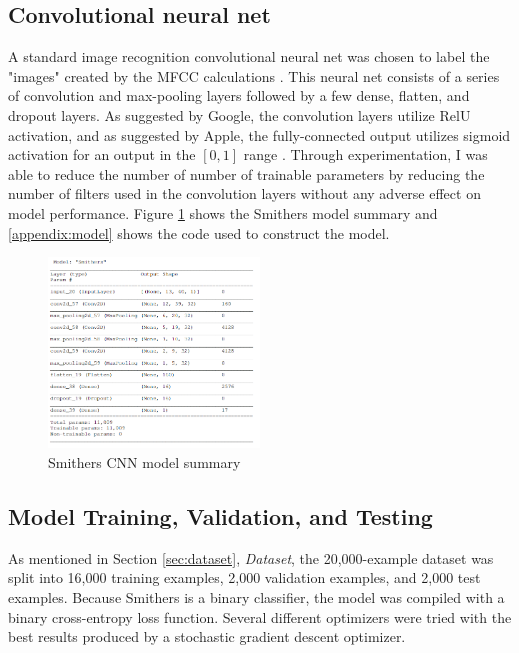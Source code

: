 \documentclass[conference]{IEEEtran}
\begin{document}
\subsection{Convolutional neural net}

A standard image recognition convolutional neural net was chosen to label the "images"
created by the MFCC calculations \cite{hymel}.
This neural net consists of a series of convolution and max-pooling layers
followed by a few dense, flatten, and dropout layers.
As suggested by Google, the convolution layers utilize RelU activation,
and as suggested by Apple, the fully-connected output utilizes sigmoid activation
for an output in the $[0,1]$ range \cite{smallfoot} \cite{Efficient}.
Through experimentation, I was able to reduce the number of number of trainable parameters
by reducing the number of filters used in the convolution layers
without any adverse effect on model performance.
Figure \ref{fig:cnn} shows the Smithers model summary
and \ref{appendix:model} shows the code used to construct the model.

\begin{figure}[htbp]
    \centerline{\includegraphics[width=0.5\textwidth]{figs/cnn.png}}
    \caption{Smithers CNN model summary}
    \label{fig:cnn}
\end{figure}


\subsection{Model Training, Validation, and Testing}
As mentioned in Section \ref{sec:dataset}, \textit{Dataset},
the 20,000-example dataset was split into 16,000 training examples,
2,000 validation examples, and 2,000 test examples.
Because Smithers is a binary classifier, the model was compiled
with a binary cross-entropy loss function.
Several different optimizers were tried with the best results 
produced by a stochastic gradient descent optimizer.
\end{document}
